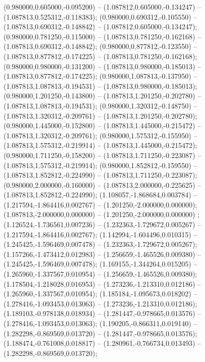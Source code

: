  (0.980000,0.605000,-0.095200) -- (1.087812,0.605000,-0.134247) -- (1.087813,0.525312,-0.118383);
 (0.980000,0.690312,-0.105550) -- (1.087813,0.690312,-0.148842) -- (1.087812,0.605000,-0.134247);
 (0.980000,0.781250,-0.115000) -- (1.087813,0.781250,-0.162168) -- (1.087813,0.690312,-0.148842);
 (0.980000,0.877812,-0.123550) -- (1.087813,0.877812,-0.174225) -- (1.087813,0.781250,-0.162168);
 (0.980000,0.980000,-0.131200) -- (1.087813,0.980000,-0.185013) -- (1.087813,0.877812,-0.174225);
 (0.980000,1.087813,-0.137950) -- (1.087813,1.087813,-0.194531) -- (1.087813,0.980000,-0.185013);
 (0.980000,1.201250,-0.143800) -- (1.087813,1.201250,-0.202780) -- (1.087813,1.087813,-0.194531);
 (0.980000,1.320312,-0.148750) -- (1.087813,1.320312,-0.209761) -- (1.087813,1.201250,-0.202780);
 (0.980000,1.445000,-0.152800) -- (1.087813,1.445000,-0.215472) -- (1.087813,1.320312,-0.209761);
 (0.980000,1.575312,-0.155950) -- (1.087813,1.575312,-0.219914) -- (1.087813,1.445000,-0.215472);
 (0.980000,1.711250,-0.158200) -- (1.087813,1.711250,-0.223087) -- (1.087813,1.575312,-0.219914);
 (0.980000,1.852812,-0.159550) -- (1.087813,1.852812,-0.224990) -- (1.087813,1.711250,-0.223087);
 (0.980000,2.000000,-0.160000) -- (1.087813,2.000000,-0.225625) -- (1.087813,1.852812,-0.224990);
 (1.108057,-1.868684,0.003784) -- (1.217594,-1.864416,0.002767) -- (1.201250,-2.000000,0.000000);
 (1.087813,-2.000000,0.000000) -- (1.201250,-2.000000,0.000000) ;
 (1.126524,-1.736561,0.007236) -- (1.232363,-1.729672,0.005267) -- (1.217594,-1.864416,0.002767);
 (1.142994,-1.604496,0.010315) -- (1.245425,-1.596469,0.007478) -- (1.232363,-1.729672,0.005267);
 (1.157266,-1.473412,0.012983) -- (1.256659,-1.465526,0.009380) -- (1.245425,-1.596469,0.007478);
 (1.169155,-1.344264,0.015205) -- (1.265960,-1.337567,0.010954) -- (1.256659,-1.465526,0.009380);
 (1.178504,-1.218028,0.016953) -- (1.273236,-1.213310,0.012186) -- (1.265960,-1.337567,0.010954);
 (1.185184,-1.095673,0.018202) -- (1.278416,-1.093453,0.013063) -- (1.273236,-1.213310,0.012186);
 (1.189103,-0.978138,0.018934) -- (1.281447,-0.978665,0.013576) -- (1.278416,-1.093453,0.013063);
 (1.190205,-0.866311,0.019140) -- (1.282298,-0.869569,0.013720) -- (1.281447,-0.978665,0.013576);
 (1.188474,-0.761008,0.018817) -- (1.280961,-0.766734,0.013493) -- (1.282298,-0.869569,0.013720);
